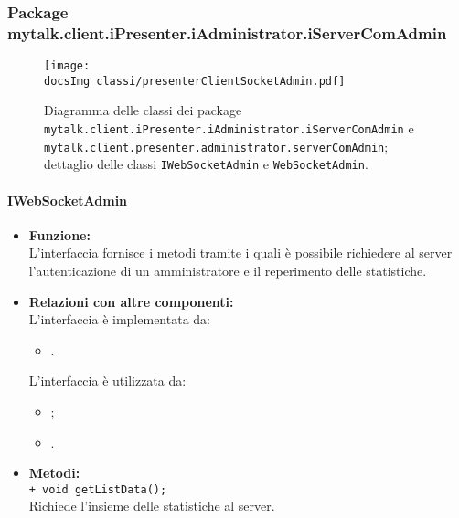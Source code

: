 {{\begin{sloppypar}
{{\begin{itemize}
			\end{itemize}
		}

	}
	
	
	\subsubsection{Package mytalk.client.iPresenter.iAdministrator.iServerComAdmin}{
	
		\begin{figure}[h!tbp]
		\centering
		\label{fig:adminSocketAdmin}
		\texttt{[image: \\docsImg classi/presenterClientSocketAdmin.pdf]}
\caption{Diagramma delle classi dei package \nolinkurl{mytalk.client.iPresenter.iAdministrator.iServerComAdmin} e  \nolinkurl{mytalk.client.presenter.administrator.serverComAdmin}; dettaglio delle classi \nolinkurl{IWebSocketAdmin} e \nolinkurl{WebSocketAdmin}.}
	\end{figure}	
		
		\paragraph{IWebSocketAdmin}\label{par:IWebSocketAdmin}{
			\begin{itemize}
				\item[] \textbf{Funzione:}\\
					L'interfaccia fornisce i metodi tramite i quali è possibile richiedere al server\g~ l'autenticazione di un amministratore e il reperimento delle statistiche.\\
			
				\item[] \textbf{Relazioni con altre componenti:}\\
					L'interfaccia è implementata da:
					\begin{itemize}
						\item[] .
					\end{itemize}
					L'interfaccia è utilizzata da:
					\begin{itemize}
						\item[] ;
						\item[] .\\
					\end{itemize}
			
				\item[] \textbf{Metodi:}{ \\
						\texttt{+ void getListData();}\\
						Richiede l'insieme delle statistiche al server\g.\\
						
}
\end{itemize}}}
\end{sloppypar}}}
